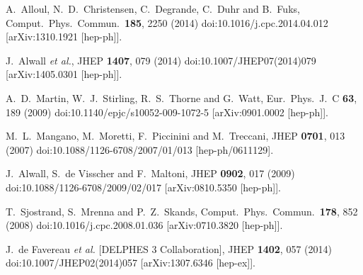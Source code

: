 \documentclass{ws-mpla}
\begin{document}
\begin{thebibliography}{99}
  A.~Alloul, N.~D.~Christensen, C.~Degrande, C.~Duhr and B.~Fuks,
  Comput.\ Phys.\ Commun.\  {\bf 185}, 2250 (2014)
  doi:10.1016/j.cpc.2014.04.012
  [arXiv:1310.1921 [hep-ph]].

  J.~Alwall {\it et al.},
  JHEP {\bf 1407}, 079 (2014)
  doi:10.1007/JHEP07(2014)079
  [arXiv:1405.0301 [hep-ph]].
    
  A.~D.~Martin, W.~J.~Stirling, R.~S.~Thorne and G.~Watt,
  Eur.\ Phys.\ J.\ C {\bf 63}, 189 (2009)
  doi:10.1140/epjc/s10052-009-1072-5
  [arXiv:0901.0002 [hep-ph]].
  
  M.~L.~Mangano, M.~Moretti, F.~Piccinini and M.~Treccani,
  JHEP {\bf 0701}, 013 (2007)
  doi:10.1088/1126-6708/2007/01/013
  [hep-ph/0611129].

  J.~Alwall, S.~de Visscher and F.~Maltoni,
  JHEP {\bf 0902}, 017 (2009)
  doi:10.1088/1126-6708/2009/02/017
  [arXiv:0810.5350 [hep-ph]].

  T.~Sjostrand, S.~Mrenna and P.~Z.~Skands,
  Comput.\ Phys.\ Commun.\  {\bf 178}, 852 (2008)
  doi:10.1016/j.cpc.2008.01.036
  [arXiv:0710.3820 [hep-ph]].

  J.~de Favereau {\it et al.} [DELPHES 3 Collaboration],
  JHEP {\bf 1402}, 057 (2014)
  doi:10.1007/JHEP02(2014)057
  [arXiv:1307.6346 [hep-ex]].


\end{thebibliography}
\end{document}
